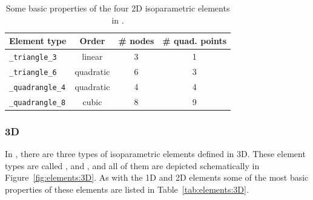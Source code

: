 \begin{table}[!htb]
\begin{center}
\begin{tabular}{l|ccc}
\toprule
Element type & Order & \# nodes & \# quad. points \\
\midrule
\texttt{\_triangle\_3} & linear & 3 & 1 \\
\texttt{\_triangle\_6} & quadratic & 6 & 3 \\
\hline
\texttt{\_quadrangle\_4} & quadratic & 4 & 4 \\
\texttt{\_quadrangle\_8} & cubic & 8 & 9 \\
\bottomrule
\end{tabular}
\end{center}
\caption{Some basic properties of the four 2D isoparametric elements in \akantu.}
\label{tab:elements:2D}
\end{table}

\subsubsection*{3D}

In \akantu, there are three types of isoparametric elements defined in 3D. These
element types are called ,  and
, and all of them are depicted schematically in
Figure~\ref{fig:elements:3D}. As with the 1D and 2D elements some of the most
basic properties of these elements are listed in Table~\ref{tab:elements:3D}.

